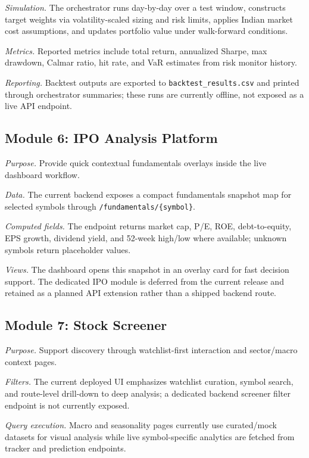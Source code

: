 \documentclass[12pt,a4paper]{report}
\numberwithin{equation}{chapter}
\begin{document}
\textit{Simulation.} The orchestrator runs day-by-day over a test window, constructs target weights via volatility-scaled sizing and risk limits, applies Indian market cost assumptions, and updates portfolio value under walk-forward conditions.

\textit{Metrics.} Reported metrics include total return, annualized Sharpe, max drawdown, Calmar ratio, hit rate, and VaR estimates from risk monitor history.

\textit{Reporting.} Backtest outputs are exported to \texttt{backtest\_results.csv} and printed through orchestrator summaries; these runs are currently offline, not exposed as a live API endpoint.

\subsection{Module 6: IPO Analysis Platform}

\textit{Purpose.} Provide quick contextual fundamentals overlays inside the live dashboard workflow.

\textit{Data.} The current backend exposes a compact fundamentals snapshot map for selected symbols through \texttt{/fundamentals/\{symbol\}}.

\textit{Computed fields.} The endpoint returns market cap, P/E, ROE, debt-to-equity, EPS growth, dividend yield, and 52-week high/low where available; unknown symbols return placeholder values.

\textit{Views.} The dashboard opens this snapshot in an overlay card for fast decision support.
The dedicated IPO module is deferred from the current release and retained as a planned API extension rather than a shipped backend route.

\subsection{Module 7: Stock Screener}

\textit{Purpose.} Support discovery through watchlist-first interaction and sector/macro context pages.

\textit{Filters.} The current deployed UI emphasizes watchlist curation, symbol search, and route-level drill-down to deep analysis; a dedicated backend screener filter endpoint is not currently exposed.

\textit{Query execution.} Macro and seasonality pages currently use curated/mock datasets for visual analysis while live symbol-specific analytics are fetched from tracker and prediction endpoints.
\end{document}

